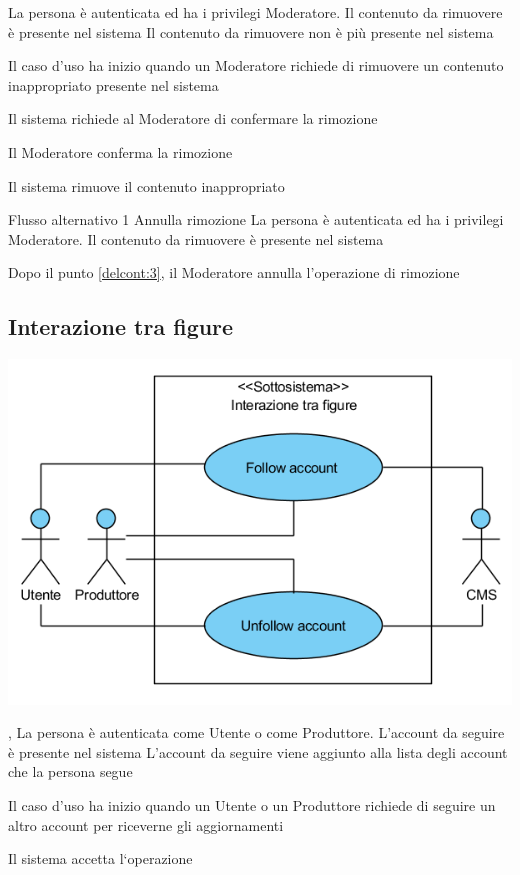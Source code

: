\tabcuvspace

{}
{La persona è autenticata ed ha i privilegi Moderatore. Il contenuto da rimuovere è presente nel sistema}
{Il contenuto da rimuovere non è più presente nel sistema}
{\begin{enumCU}
	\item Il caso d'uso ha inizio quando un Moderatore richiede di rimuovere un contenuto inappropriato presente nel sistema
	\item Il sistema richiede al Moderatore di confermare la rimozione
	\item Il Moderatore conferma la rimozione \label{delcont:3}
	\item Il sistema rimuove il contenuto inappropriato
\end{enumCU}}
%
{Flusso alternativo 1}%
{Annulla rimozione}%
{La persona è autenticata ed ha i privilegi Moderatore. Il contenuto da rimuovere è presente nel sistema}
{\postNulle}%
{\begin{enumCU}
		\item Dopo il punto \ref{delcont:3}, il Moderatore annulla l'operazione di rimozione
\end{enumCU}}%


\subsection{Interazione tra figure}
\begin{center}
   \includegraphics[width=\textwidth]{assets/visualParadigm/InterazioneTraFigure}
\end{center}
{, }
{La persona è autenticata come Utente o come Produttore. L'account da seguire è presente nel sistema}
{L'account da seguire viene aggiunto alla lista degli account che la persona segue}
{\begin{enumCU}
	\item Il caso d'uso ha inizio quando un Utente o un Produttore richiede di seguire un altro account per riceverne gli aggiornamenti
	\item Il sistema accetta l`operazione
\end{enumCU}}

